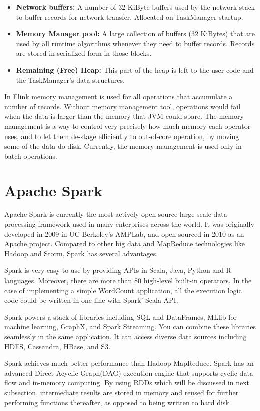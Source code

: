 \begin{itemize}
\item \textbf{Network buffers:} A number of 32 KiByte buffers used by the network stack to buffer records for network transfer. Allocated on TaskManager startup. 
\item \textbf{Memory Manager pool:} A large collection of buffers (32 KiBytes) that are used by all runtime algorithms whenever they need to buffer records. Records are stored in serialized form in those blocks.
\item \textbf{Remaining (Free) Heap:} This part of the heap is left to the user code and the TaskManager's data structures.
\end{itemize}
 
In Flink memory management is used for all operations that accumulate a number of records. Without memory management tool, operations would fail when the data is larger than the memory that JVM could spare. The memory management is a way to control very precisely how much memory each operator uses, and to let them de-stage efficiently to out-of-core operation, by moving some of the data do disk. Currently, the memory management is used only in batch operations. 

\section{Apache Spark}
Apache Spark is currently the most actively open source large-scale data processing framework used in many enterprises across the world. It was originally developed in 2009 in UC Berkeley's AMPLab, and open sourced in 2010 as an Apache project. Compared to other big data and MapReduce technologies like Hadoop and Storm, Spark has several advantages. 

Spark is very easy to use by providing APIs in Scala, Java, Python and R languages. Moreover, there are more than 80 high-level built-in operators.  In the case of implementing a simple WordCount application, all the execution logic code could be written in one line with Spark' Scala API.

Spark powers a stack of libraries including SQL and DataFrames, MLlib for machine learning, GraphX, and Spark Streaming. You can combine these libraries seamlessly in the same application. It can access diverse data sources including HDFS, Cassandra, HBase, and S3.

Spark achieves much better performance than Hadoop MapReduce. Spark has an advanced Direct Acyclic Graph(DAG) execution engine that supports cyclic data flow and in-memory computing. By using RDDs which will be discussed in next subsection, intermediate results are stored in memory and reused for further performing functions thereafter, as opposed to being written to hard disk. 

